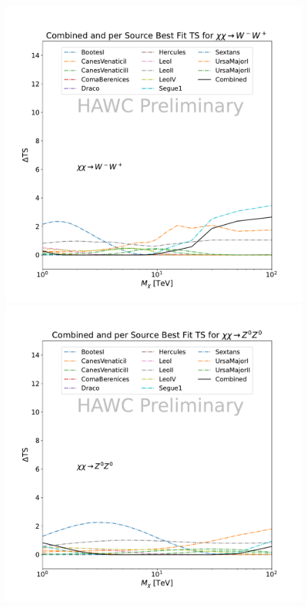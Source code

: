\begin{figure}[t]
{        \includegraphics[scale=0.21]{figures/glory_duck/hawc/CombinedTS_data_ww_.pdf}
        \includegraphics[scale=0.21]{figures/glory_duck/hawc/CombinedTS_data_zz_.pdf}
}
\end{figure}
